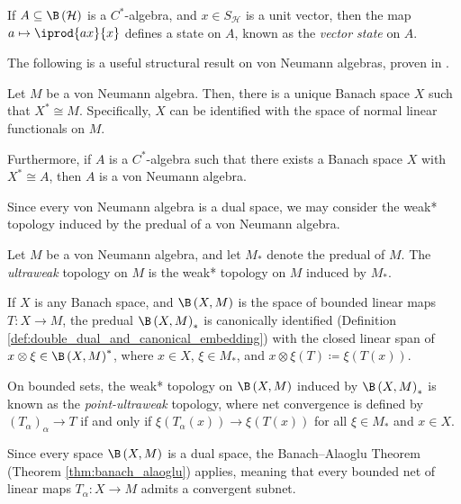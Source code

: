 \begin{example}
  If $A\subseteq \B\left( \mathcal{H} \right)$ is a $C^{\ast}$-algebra, and $x\in S_{\mathcal{H}}$ is a unit vector, then the map $a\mapsto \iprod{ax}{x}$ defines a state on $A$, known as the \textit{vector state} on $A$.
\end{example}
The following is a useful structural result on von Neumann algebras, proven in \cite[Section III.2.4]{blackadar_operator_algebras}.
\begin{theorem}
  Let $M$ be a von Neumann algebra. Then, there is a unique Banach space $X$ such that $X^{\ast}\cong M$. Specifically, $X$ can be identified with the space of normal linear functionals on $M$.\newline

  Furthermore, if $A$ is a $C^{\ast}$-algebra such that there exists a Banach space $X$ with $X^{\ast}\cong A$, then $A$ is a von Neumann algebra.
\end{theorem}
Since every von Neumann algebra is a dual space, we may consider the weak* topology induced by the predual of a von Neumann algebra.
\begin{definition}
  Let $M$ be a von Neumann algebra, and let $M_{\ast}$ denote the predual of $M$. The \textit{ultraweak} topology on $M$ is the weak* topology on $M$ induced by $M_{\ast}$.\newline

  If $X$ is any Banach space, and $\B\left( X,M \right)$ is the space of bounded linear maps $T\colon X\rightarrow M$, the predual $\B\left( X,M \right)_{\ast}$ is canonically identified (Definition \ref{def:double_dual_and_canonical_embedding}) with the closed linear span of $x\otimes \xi\in \B\left( X,M \right)^{\ast}$, where $x\in X$, $\xi\in M_{\ast}$, and $x\otimes \xi\left( T \right) \coloneq \xi\left( T(x) \right)$.\newline

  On bounded sets, the weak* topology on $\B\left( X,M \right)$ induced by $\B\left( X,M \right)_{\ast}$ is known as the \textit{point-ultraweak} topology, where net convergence is defined by $\left( T_{\alpha} \right)_{\alpha}\rightarrow T$ if and only if $\xi\left( T_{\alpha}\left( x \right) \right) \rightarrow \xi\left( T\left( x \right) \right)$ for all $\xi\in M_{\ast}$ and $x\in X$.
\end{definition}
Since every space $\B\left( X,M \right)$ is a dual space, the Banach--Alaoglu Theorem (Theorem \ref{thm:banach_alaoglu}) applies, meaning that every bounded net of linear maps $T_{\alpha}\colon X\rightarrow M$ admits a convergent subnet.\newline

